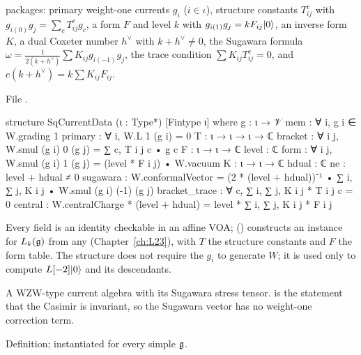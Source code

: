 \begin{definition}\label{l25:def:sqcd}
 packages: primary weight-one currents $g_i$ ($i\in\iota$), structure constants $T_{ij}^c$
with $g_{i(0)}g_j=\sum_cT_{ij}^cg_c$, a form $F$ and level $k$ with $g_{i(1)}g_j=kF_{ij}|0\rangle$, an inverse form
$K$, a dual Coxeter number $h^\vee$ with $k+h^\vee\ne0$, the Sugawara formula
$\omega=\frac{1}{2(k+h^\vee)}\sum K_{ij}g_{i(-1)}g_j$, the trace condition $\sum K_{ij}T_{ij}^c=0$, and
$c(k+h^\vee)=k\sum K_{ij}F_{ij}$.
\end{definition}
\noindent File .
\begin{leancode}
structure SqCurrentData (ι : Type*) [Fintype ι] where
  g : ι → 𝒱
  mem : ∀ i, g i ∈ W.grading 1
  primary : ∀ i, W.L 1 (g i) = 0
  T : ι → ι → ι → ℂ
  bracket : ∀ i j, W.smul (g i) 0 (g j) = ∑ c, T i j c • g c
  F : ι → ι → ℂ
  level : ℂ
  form : ∀ i j, W.smul (g i) 1 (g j) = (level * F i j) • W.vacuum
  K : ι → ι → ℂ
  hdual : ℂ
  ne : level + hdual ≠ 0
  sugawara : W.conformalVector
    = (2 * (level + hdual))⁻¹ • ∑ i, ∑ j, K i j • W.smul (g i) (-1) (g j)
  bracket_trace : ∀ c, ∑ i, ∑ j, K i j * T i j c = 0
  central : W.centralCharge * (level + hdual) = level * ∑ i, ∑ j, K i j * F i j
\end{leancode}
\begin{dictionary}
Every field is an identity checkable in an affine VOA; 
() constructs an instance for $L_k(\mathfrak g)$ from any 
(Chapter~\ref{ch:L23}), with $T$ the structure constants and $F$ the form table. The structure does not require
the $g_i$ to generate $W$; it is used only to compute $L[-2]|0\rangle$ and its descendants.
\end{dictionary}
\begin{physics}
A WZW-type current algebra with its Sugawara stress tensor.  is the statement that the
Casimir is invariant, so the Sugawara vector has no weight-one correction term.
\end{physics}
\begin{status}
Definition; instantiated for every simple $\mathfrak g$.
\end{status}

